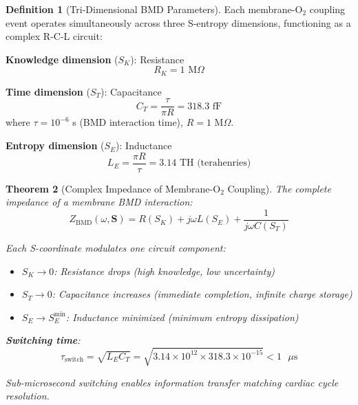 \documentclass[11pt,a4paper]{article}
\newtheorem{theorem}{Theorem}[section]
\theoremstyle{definition}
\newtheorem{definition}[theorem]{Definition}
\theoremstyle{remark}
\begin{document}
\begin{definition}[Tri-Dimensional BMD Parameters]
Each membrane-O$_2$ coupling event operates simultaneously across three S-entropy dimensions, functioning as a complex R-C-L circuit:

\textbf{Knowledge dimension} ($S_K$): Resistance
\begin{equation}
R_K = 1 \text{ M}\Omega
\end{equation}

\textbf{Time dimension} ($S_T$): Capacitance
\begin{equation}
C_T = \frac{\tau}{\pi R} = 318.3 \text{ fF}
\end{equation}
where $\tau = 10^{-6}$ s (BMD interaction time), $R = 1$ M$\Omega$.

\textbf{Entropy dimension} ($S_E$): Inductance
\begin{equation}
L_E = \frac{\pi R}{\tau} = 3.14 \text{ TH (terahenries)}
\end{equation}
\end{definition}

\begin{theorem}[Complex Impedance of Membrane-O$_2$ Coupling]
The complete impedance of a membrane BMD interaction:
\begin{equation}
Z_{\text{BMD}}(\omega, \mathbf{S}) = R(S_K) + j\omega L(S_E) + \frac{1}{j\omega C(S_T)}
\end{equation}

Each S-coordinate modulates one circuit component:
\begin{itemize}
\item $S_K \to 0$: Resistance drops (high knowledge, low uncertainty)
\item $S_T \to 0$: Capacitance increases (immediate completion, infinite charge storage)
\item $S_E \to S_E^{\text{min}}$: Inductance minimized (minimum entropy dissipation)
\end{itemize}

\textbf{Switching time}:
\begin{equation}
\tau_{\text{switch}} = \sqrt{L_E C_T} = \sqrt{3.14 \times 10^{12} \times 318.3 \times 10^{-15}} < 1 \text{ }\mu\text{s}
\end{equation}

Sub-microsecond switching enables information transfer matching cardiac cycle resolution.
\end{theorem}
\end{document}
